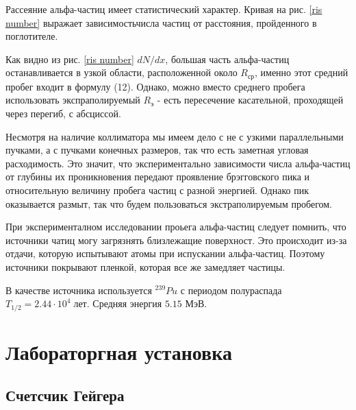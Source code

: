 \documentclass[a4paper]{article}
\begin{document}
Рассеяние альфа-частиц имеет статистический характер. Кривая на рис. \ref{ris number} выражает зависимостьчисла частиц 
от расстояния, пройденного в поглотителе. \par 

Как видно из рис. \ref{ris number} $dN/dx$, большая часть альфа-частиц останавливается в узкой области, расположенной около 
$R_{ср}$, именно этот средний пробег входит в формулу (12). Однако, можно вместо среднего пробега использовать экспраполируемый 
$R_э$ - есть пересечение касательной, проходящей через перегиб, с абсциссой. \par

Несмотря на наличие коллиматора мы имеем дело с не с узкими параллельными пучками, а с пучками конечных размеров, так что есть заметная 
угловая расходимость. Это значит, что экспериментально зависимости числа альфа-частиц от глубины их проникновения передают проявление 
брэгговского пика и относительную величину пробега частиц с разной энергией. Однако пик оказывается размыт, так что будем пользоваться экстраполируемым пробегом. \par 

При эксперименталном исследовании проьега альфа-частиц следует помнить, что источники чатиц могу загрязнять 
близлежащие поверхност. Это происходит из-за отдачи, которую испытывают атомы при испускании альфа-частиц. Поэтому 
источники покрывают пленкой, которая все же замедляет частицы. \par 

В качестве источника используется $^{239}Pu$ с периодом полураспада $T_{1/2} = 2.44 \cdot 10^4 \;  лет$. 
Средняя энергия $5.15$ МэВ.



\section{Лабораторгная установка}



\subsection{Счетсчик Гейгера}
\end{document}
